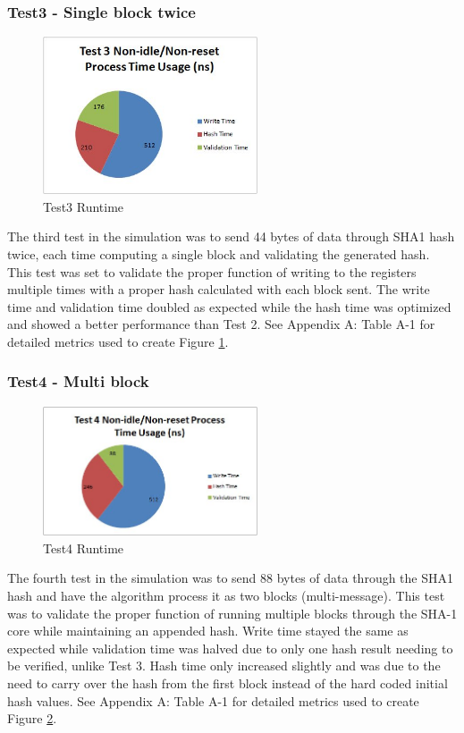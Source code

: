 \documentclass[journal]{IEEEtran}
\begin{document}
\subsubsection{Test3 - Single block twice}
\begin{figure}[ht]
\centering
\includegraphics[width=2.5in]{Test3.jpg}
\caption{Test3 Runtime}
\label{fig_test3Runtime}
\end{figure}
The third test in the simulation was to send 44 bytes of data through SHA1 hash twice, each time computing a single block and validating the generated hash.  This test was set to validate the proper function of writing to the registers multiple times with a proper hash calculated with each block sent.  The write time and validation time doubled as expected while the hash time was optimized and showed a better performance than Test 2.  See Appendix A: Table A-1 for detailed metrics used to create Figure \ref{fig_test3Runtime}. 
\subsubsection{Test4 - Multi block}
\begin{figure}[ht]
\centering
\includegraphics[width=2.5in]{Test4.jpg}
\caption{Test4 Runtime}
\label{fig_test4Runtime}
\end{figure} 
The fourth test in the simulation was to send 88 bytes of data through the SHA1 hash and have the algorithm process it as two blocks (multi-message).  This test was to validate the proper function of running multiple blocks through the SHA-1 core while maintaining an appended hash.  Write time stayed the same as expected while validation time was halved due to only one hash result needing to be verified, unlike Test 3.  Hash time only increased slightly and was due to the need to carry over the hash from the first block instead of the hard coded initial hash values.  See Appendix A: Table A-1 for detailed metrics used to create Figure \ref{fig_test4Runtime}.
\end{document}
